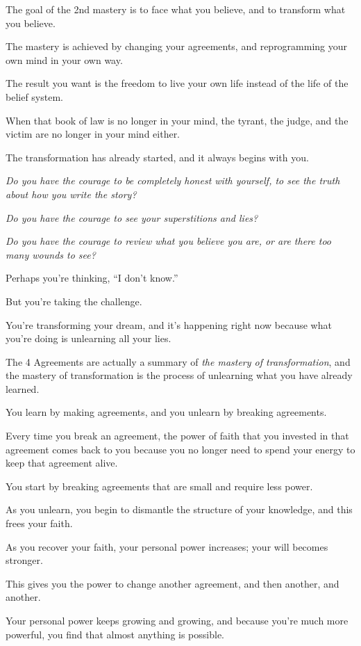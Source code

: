 \documentclass{article}
\numberwithin{equation}{section}
\begin{document}
%
The goal of the 2nd mastery is to face what you believe, and to transform what you believe.

The mastery is achieved by changing your agreements, and reprogramming your own mind in your own way.

The result you want is the freedom to live your own life instead of the life of the belief system.

When that book of law is no longer in your mind, the tyrant, the judge, and the victim are no longer in your mind either.

%
The transformation has already started, and it always begins with you.

\textit{Do you have the courage to be completely honest with yourself, to see the truth about how you write the story?}

\textit{Do you have the courage to see your superstitions and lies?}

\textit{Do you have the courage to review what you believe you are, or are there too many wounds to see?}

Perhaps you're thinking, ``I don't know.''

But you're taking the challenge.

You're transforming your dream, and it's happening right now because what you're doing is unlearning all your lies.

%
The 4 Agreements are actually a summary of \textit{the mastery of transformation}, and the mastery of transformation is the process of unlearning what you have already learned.

You learn by making agreements, and you unlearn by breaking agreements.

Every time you break an agreement, the power of faith that you invested in that agreement comes back to you because you no longer need to spend your energy to keep that agreement alive.

%
You start by breaking agreements that are small and require less power.

As you unlearn, you begin to dismantle the structure of your knowledge, and this frees your faith.

As you recover your faith, your personal power increases; your will becomes stronger.

This gives you the power to change another agreement, and then another, and another.

Your personal power keeps growing and growing, and because you're much more powerful, you find that almost anything is possible.
\end{document}
